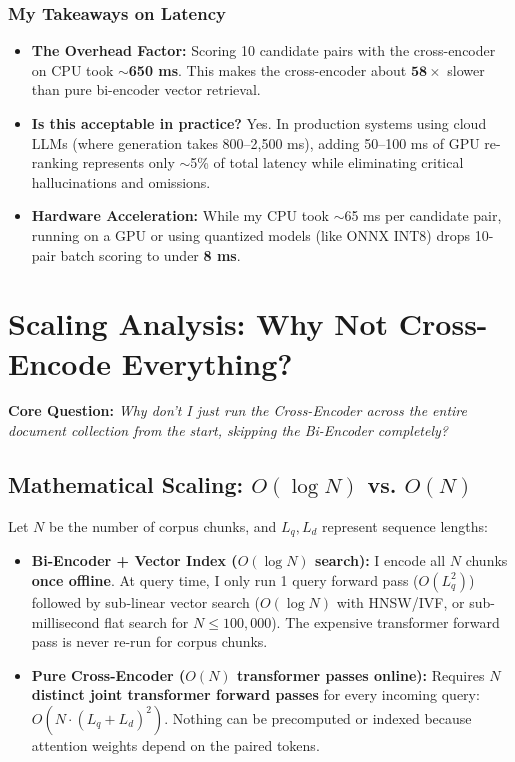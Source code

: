 \documentclass[10pt,a4paper]{article}
\begin{document}
\vspace{-3pt}
\subsubsection*{My Takeaways on Latency}
\begin{itemize}[leftmargin=1.4em, itemsep=1.2pt, topsep=1pt]
  \item \textbf{The Overhead Factor:} Scoring 10 candidate pairs with the cross-encoder on CPU took $\sim$\textbf{650 ms}. This makes the cross-encoder about $\mathbf{58\times}$ slower than pure bi-encoder vector retrieval.
  \item \textbf{Is this acceptable in practice?} Yes. In production systems using cloud LLMs (where generation takes 800--2,500 ms), adding 50--100 ms of GPU re-ranking represents only $\sim$5\% of total latency while eliminating critical hallucinations and omissions.
  \item \textbf{Hardware Acceleration:} While my CPU took $\sim$65 ms per candidate pair, running on a GPU or using quantized models (like ONNX INT8) drops 10-pair batch scoring to under \textbf{8 ms}.
\end{itemize}

\vspace{1pt}

\section{Scaling Analysis: Why Not Cross-Encode Everything?}

\textbf{Core Question:} \textit{Why don't I just run the Cross-Encoder across the entire document collection from the start, skipping the Bi-Encoder completely?}

\subsection{Mathematical Scaling: \texorpdfstring{$O(\log N)$}{O(log N)} vs. \texorpdfstring{$O(N)$}{O(N)}}
Let $N$ be the number of corpus chunks, and $L_q, L_d$ represent sequence lengths:
\begin{itemize}[leftmargin=1.4em, itemsep=1.2pt, topsep=1pt]
  \item \textbf{Bi-Encoder + Vector Index ($O(\log N)$ search):}
  I encode all $N$ chunks \textbf{once offline}. At query time, I only run 1 query forward pass ($O(L_q^2)$) followed by sub-linear vector search ($O(\log N)$ with HNSW/IVF, or sub-millisecond flat search for $N \le 100{,}000$). The expensive transformer forward pass is never re-run for corpus chunks.
  \item \textbf{Pure Cross-Encoder ($O(N)$ transformer passes online):}
  Requires \textbf{$N$ distinct joint transformer forward passes} for every incoming query: $O(N \cdot (L_q + L_d)^2)$. Nothing can be precomputed or indexed because attention weights depend on the paired tokens.
\end{itemize}
\end{document}
